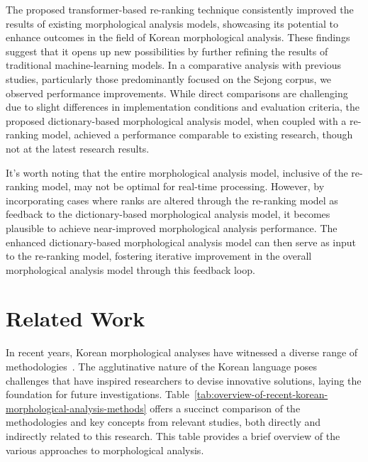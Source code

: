 \documentclass[AMS,STIX2COL]{WileyNJD-v2}
\begin{document}
    The proposed transformer-based re-ranking technique consistently improved the results of existing morphological analysis models, showcasing its potential to enhance outcomes in the field of Korean morphological analysis.
    These findings suggest that it opens up new possibilities by further refining the results of traditional machine-learning models.
    In a comparative analysis with previous studies, particularly those predominantly focused on the Sejong corpus, we observed performance improvements.
    While direct comparisons are challenging due to slight differences in implementation conditions and evaluation criteria, the proposed dictionary-based morphological analysis model, when coupled with a re-ranking model, achieved a performance comparable to existing research, though not at the latest research results.

    It's worth noting that the entire morphological analysis model, inclusive of the re-ranking model, may not be optimal for real-time processing.
    However, by incorporating cases where ranks are altered through the re-ranking model as feedback to the dictionary-based morphological analysis model, it becomes plausible to achieve near-improved morphological analysis performance.
    The enhanced dictionary-based morphological analysis model can then serve as input to the re-ranking model, fostering iterative improvement in the overall morphological analysis model through this feedback loop.


    \section{Related Work}\label{sec:related-work}

    In recent years, Korean morphological analyses have witnessed a diverse range of methodologies~\cite{KwonHC1991, LeeDG2009, ShimKS2011, LeeJS2011, ShinJC2012, LeeCK2013, NaSH2014, NaSH2015, HwangHS2016, KimHM2016, ChungES2016, LeeCH2016, Li2017, NaSH2018, KimSW2018, ChoiYS2018, MinJW2018, MinJW2019, KimHM2019, SongHJ2019, MinJW2020, SongHJ2020, ChoiYS2020, HwangHS2020, KimHJ2021, YounJY2021, MinJW2022, KimJM2022, ShinHJ2023}.
    The agglutinative nature of the Korean language poses challenges that have inspired researchers to devise innovative solutions, laying the foundation for future investigations.
    Table~\ref{tab:overview-of-recent-korean-morphological-analysis-methods} offers a succinct comparison of the methodologies and key concepts from relevant studies, both directly and indirectly related to this research.
    This table provides a brief overview of the various approaches to morphological analysis.
\end{document}
